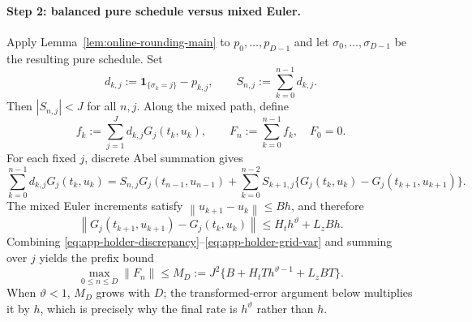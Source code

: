 \documentclass[twoside,11pt]{article}
\newcommand{\norm}[1]{\left\lVert #1\right\rVert}
\newcommand{\one}{\mathbf{1}}
\begin{document}
\paragraph{Step 2: balanced pure schedule versus mixed Euler.}
Apply Lemma~\ref{lem:online-rounding-main} to $p_0,\ldots,p_{D-1}$ and let
$\sigma_0,\ldots,\sigma_{D-1}$ be the resulting pure schedule.  Set
\begin{equation}
 d_{k,j}:=\one_{\{\sigma_k=j\}}-p_{k,j},
 \qquad
 S_{n,j}:=\sum_{k=0}^{n-1}d_{k,j}.
 \label{eq:app-holder-discrepancy}
\end{equation}
Then $|S_{n,j}|<J$ for all $n,j$.  Along the mixed path, define
\begin{equation}
 f_k:=\sum_{j=1}^Jd_{k,j}G_j(t_k,u_k),
 \qquad
 F_n:=\sum_{k=0}^{n-1}f_k,
 \quad F_0=0.
 \label{eq:app-holder-forcing}
\end{equation}
For each fixed $j$, discrete Abel summation gives
\begin{equation}
 \sum_{k=0}^{n-1}d_{k,j}G_j(t_k,u_k)
 =S_{n,j}G_j(t_{n-1},u_{n-1})
  +\sum_{k=0}^{n-2}S_{k+1,j}
   \{G_j(t_k,u_k)-G_j(t_{k+1},u_{k+1})\}.
 \label{eq:app-holder-abel}
\end{equation}
The mixed Euler increments satisfy $\norm{u_{k+1}-u_k}\le Bh$, and therefore
\begin{equation}
 \norm{G_j(t_{k+1},u_{k+1})-G_j(t_k,u_k)}
 \le H_th^\vartheta+L_zBh.
 \label{eq:app-holder-grid-var}
\end{equation}
Combining \eqref{eq:app-holder-discrepancy}--\eqref{eq:app-holder-grid-var}
and summing over $j$ yields the prefix bound
\begin{equation}
 \max_{0\le n\le D}\norm{F_n}
 \le M_D
 :=J^2\{B+H_tT h^{\vartheta-1}+L_zBT\}.
 \label{eq:app-holder-prefix}
\end{equation}
When $\vartheta<1$, $M_D$ grows with $D$; the transformed-error argument below
multiplies it by $h$, which is precisely why the final rate is
$h^\vartheta$ rather than $h$.
\end{document}
